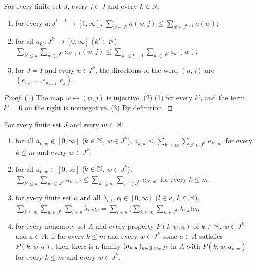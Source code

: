 \begin{lemma}
\label{lem:words-snoc}
\leanok
For every finite set $J$, every $j \in J$ and every $k \in \mathbb{N}$:
\begin{enumerate}
  \item for every $a \colon J^{k+1} \to [0, \infty]$,
    $\sum_{w \in J^k} a(w, j) \leq \sum_{w \in J^{k+1}} a(w)$;
  \item for all $a_{k'} \colon J^{k'} \to [0, \infty]$ ($k' \in \mathbb{N}$),
    $\sum_{k' \leq k} \sum_{w \in J^{k'}} a_{k'+1}(w, j)
      \leq \sum_{k' \leq k+1} \sum_{w \in J^{k'}} a_{k'}(w)$;
  \item for $J = I$ and every $u \in I^k$, the directions of the word $(u, j)$ are
    $(e_{u_0}, \dots, e_{u_{k-1}}, e_j)$.
\end{enumerate}
\end{lemma}

\begin{proof}
\leanok
(1) The map $w \mapsto (w, j)$ is injective. (2) (1) for every $k'$, and the term $k' = 0$ on the
right is nonnegative. (3) By definition.
\end{proof}

\begin{lemma}
\label{lem:sums-over-words}
\leanok
For every finite set $J$ and every $m \in \mathbb{N}$:
\begin{enumerate}
  \item for all $a_{k,w} \in [0, \infty]$ ($k \in \mathbb{N}$, $w \in J^k$),
    $a_{k,w} \leq \sum_{k' \leq m} \sum_{w' \in J^{k'}} a_{k',w'}$ for every $k \leq m$ and
    every $w \in J^k$;
  \item for all $a_{k,w} \in [0, \infty]$ ($k \in \mathbb{N}$, $w \in J^k$),
    $\sum_{k' \leq k} \sum_{w' \in J^{k'}} a_{k',w'} \leq \sum_{k' \leq m}
    \sum_{w' \in J^{k'}} a_{k',w'}$ for every $k \leq m$;
  \item for every finite set $\kappa$ and all $\lambda_{l,k}, c_l \in [0, \infty]$
    ($l \in \kappa$, $k \in \mathbb{N}$),
    $\sum_{k \leq m} \sum_{w \in J^k} \sum_{l \in \kappa} \lambda_{l,k} c_l
      = \sum_{l \in \kappa} \bigl(\sum_{k \leq m} \sum_{w \in J^k} \lambda_{l,k}\bigr) c_l$;
  \item for every nonempty set $A$ and every property $P(k, w, a)$ of $k \in \mathbb{N}$, $w \in J^k$
    and $a \in A$: if for every $k \leq m$ and every $w \in J^k$ some $a \in A$ satisfies
    $P(k, w, a)$, then there is a family $(a_{k,w})_{k \in \mathbb{N}, w \in J^k}$ in $A$ with
    $P(k, w, a_{k,w})$ for every $k \leq m$ and every $w \in J^k$.
\end{enumerate}
\end{lemma}

